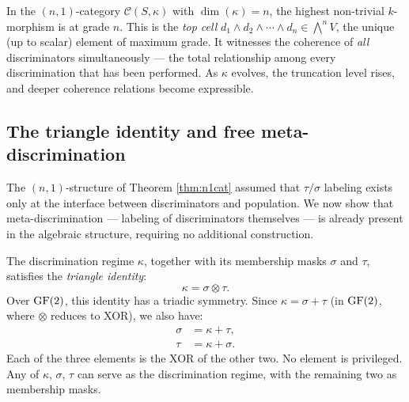 \begin{remark}
In the $(n,1)$-category $\mathcal{C}(S,\kappa)$ with
$\dim(\kappa) = n$, the highest non-trivial $k$-morphism
is at grade $n$. This is the \emph{top cell}
$d_1 \wedge d_2 \wedge \cdots \wedge d_n \in \bigwedge^n V$,
the unique (up to scalar) element of maximum grade. It
witnesses the coherence of \emph{all} discriminators
simultaneously --- the total relationship among every
discrimination that has been performed. As $\kappa$ evolves,
the truncation level rises, and deeper coherence relations
become expressible.
\end{remark}

\subsection{The triangle identity and free meta-discrimination}
\label{sec:meta}

The $(n,1)$-structure of Theorem \ref{thm:n1cat} assumed
that $\tau/\sigma$ labeling exists only at the interface
between discriminators and population. We now show that
meta-discrimination --- labeling of discriminators
themselves --- is already present in the algebraic
structure, requiring no additional construction.

\begin{definition}\label{def:triangle}
The discrimination regime $\kappa$, together with its
membership masks $\sigma$ and $\tau$, satisfies the
\emph{triangle identity}:
\begin{equation}\label{eq:triangle}
  \kappa = \sigma \otimes \tau.
\end{equation}
Over $\operatorname{GF}(2)$, this identity has a triadic symmetry.
Since $\kappa = \sigma + \tau$ (in $\operatorname{GF}(2)$, where
$\otimes$ reduces to XOR), we also have:
\begin{align}
  \sigma &= \kappa + \tau, \label{eq:tri-sigma}\\
  \tau   &= \kappa + \sigma. \label{eq:tri-tau}
\end{align}
Each of the three elements is the XOR of the other two.
No element is privileged. Any of $\kappa$, $\sigma$, $\tau$
can serve as the discrimination regime, with the remaining
two as membership masks.
\end{definition}

